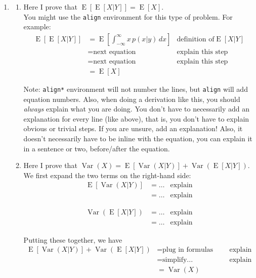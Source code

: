 \documentclass[11pt]{article}
\DeclareMathOperator{\E}{E}
\DeclareMathOperator{\Var}{Var}
\begin{document}
\begin{enumerate}

\item
\begin{enumerate}
\item Here I prove that $\E[ \E[X | Y] ] = \E[X]$.\\

You might use the {\tt align} environment for this type of problem. For example:
\begin{align*}
\E[\E[X | Y]] &= \E \left[ \int_{-\infty}^\infty x \, p(x | y) \, dx \right] &
\text{definition of} \E[X | Y] \\
&= \text{next equation} & \text{explain this step}\\
&= \text{next equation} & \text{explain this step}\\
&= \E[X]
\end{align*}

Note: {\tt align*} environment will not number the lines, but {\tt align} will
add equation numbers. Also, when doing a derivation like this, you should
{\em always} explain what you are doing. You don't have to necessarily add an
explanation for every line (like above), that is, you don't have to explain
obvious or trivial steps. If you are unsure, add an explanation! Also, it
doesn't necessarily have to be inline with the equation, you can explain it in a
sentence or two, before/after the equation.

\item Here I prove that $\Var(X) = \E[\Var(X | Y)] + \Var(\E[X | Y])$.\\

We first expand the two terms on the right-hand side:
\begin{align*}
\E[\Var(X | Y)] &= \ldots & \text{explain}\\
&= \ldots & \text{explain}
\end{align*}

\begin{align*}
\Var( \E[X | Y] ) &= \ldots & \text{explain}\\
&= \ldots & \text{explain}
\end{align*}

Putting these together, we have
\begin{align*}
\E[\Var(X | Y)] + \Var( \E[X | Y] ) &= \text{plug in formulas above} & \text{explain}\\
&= \text{simplify...}  & \text{explain}\\
&= \Var(X)
\end{align*}


\end{enumerate}
\end{enumerate}
\end{document}
